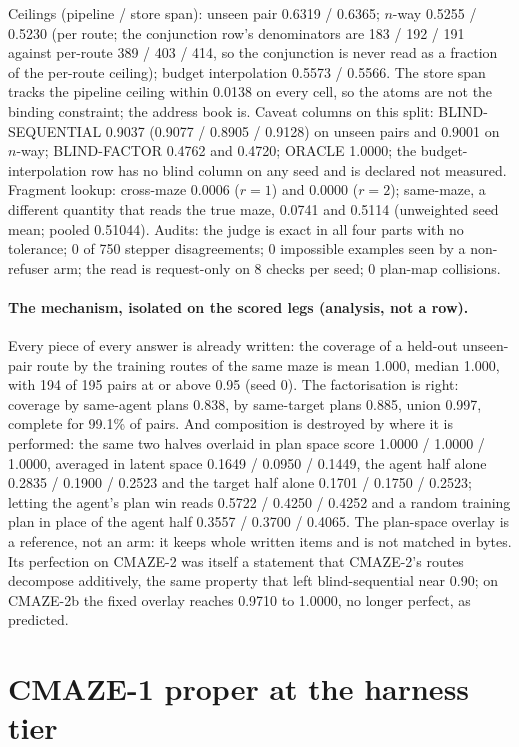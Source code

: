 \documentclass{article}
\begin{document}
\noindent Ceilings (pipeline / store span): unseen pair 0.6319 / 0.6365; $n$-way 0.5255 / 0.5230
(per route; the conjunction row's denominators are 183 / 192 / 191 against per-route 389 / 403 /
414, so the conjunction is never read as a fraction of the per-route ceiling); budget interpolation
0.5573 / 0.5566. The store span tracks the pipeline ceiling within 0.0138 on every cell, so the
atoms are not the binding constraint; the address book is. Caveat columns on this split:
BLIND-SEQUENTIAL 0.9037 (0.9077 / 0.8905 / 0.9128) on unseen pairs and 0.9001 on $n$-way;
BLIND-FACTOR 0.4762 and 0.4720; ORACLE 1.0000; the budget-interpolation row has no blind column on
any seed and is declared not measured. Fragment lookup: cross-maze 0.0006 ($r=1$) and 0.0000
($r=2$); same-maze, a different quantity that reads the true maze, 0.0741 and 0.5114 (unweighted
seed mean; pooled 0.51044).
Audits: the judge is exact in all four parts with no tolerance; 0 of 750 stepper disagreements; 0
impossible examples seen by a non-refuser arm; the read is request-only on 8 checks per seed; 0
plan-map collisions.

\paragraph{The mechanism, isolated on the scored legs (analysis, not a row).} Every piece of every
answer is already written: the coverage of a held-out unseen-pair route by the training routes of
the same maze is mean 1.000, median 1.000, with 194 of 195 pairs at or above 0.95 (seed 0). The
factorisation is right: coverage by same-agent plans 0.838, by same-target plans 0.885, union
0.997, complete for 99.1\% of pairs. And composition is destroyed by where it is performed: the
same two halves overlaid in plan space score 1.0000 / 1.0000 / 1.0000, averaged in latent space
0.1649 / 0.0950 / 0.1449, the agent half alone 0.2835 / 0.1900 / 0.2523 and the target half alone
0.1701 / 0.1750 / 0.2523; letting the agent's plan win reads 0.5722 / 0.4250 / 0.4252 and a random
training plan in place of the agent half 0.3557 / 0.3700 / 0.4065.
The plan-space overlay is a reference, not an arm: it keeps whole written items and is not matched
in bytes. Its perfection on CMAZE-2 was itself a statement that CMAZE-2's routes decompose
additively, the same property that left blind-sequential near 0.90; on CMAZE-2b the fixed overlay
reaches 0.9710 to 1.0000, no longer perfect, as predicted.

\section{CMAZE-1 proper at the harness tier}
\label{app:cmaze1}
\end{document}
